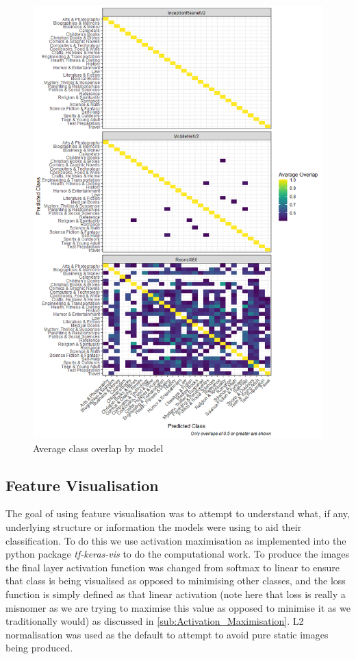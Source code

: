 \documentclass[12pt]{article}
\numberwithin{equation}{section}
\numberwithin{figure}{section}
\begin{document}
\begin{figure}
	\centering
	\captionsetup{justification=centering}
	\includegraphics[scale=0.6]{class_pred_overlap.png}
	\caption{Average class overlap by model}
	\label{fig:class_overlap}
\end{figure}
\subsection{Feature Visualisation} 
\label{sub:Feature_Visualisation} 
The goal of using feature visualisation was to attempt to understand what, if any, underlying structure or information the models were using to aid their classification. To do this we use activation maximisation as implemented into the python package \emph{tf-keras-vis}\cite{keras-vis} to do the computational work. To produce the images the final layer activation function was changed from softmax to linear to ensure that class is being visualised as opposed to minimising other classes, and the loss function is simply defined as that linear activation (note here that loss is really a misnomer as we are trying to maximise this value as opposed to minimise it as we traditionally would) as discussed in \cref{sub:Activation_Maximisation}. L2 normalisation was used as the default to attempt to avoid pure static images being produced.
\end{document}
